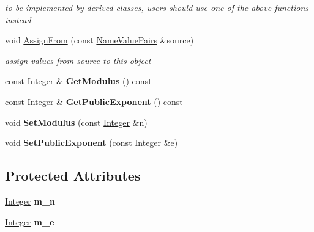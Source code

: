 \begin{DoxyCompactItemize}
\begin{DoxyCompactList}\small\item\em to be implemented by derived classes, users should use one of the above functions instead \item\end{DoxyCompactList}\item 
void \hyperlink{class_l_u_c_function_af6a95ed660e53a5fa07841f139d43ccf}{AssignFrom} (const \hyperlink{class_name_value_pairs}{NameValuePairs} \&source)
\begin{DoxyCompactList}\small\item\em assign values from source to this object \item\end{DoxyCompactList}\item 
\hypertarget{class_l_u_c_function_a0a0c4bd6c0abbed477a51a626b0592a4}{
const \hyperlink{class_integer}{Integer} \& {\bfseries GetModulus} () const }
\label{class_l_u_c_function_a0a0c4bd6c0abbed477a51a626b0592a4}

\item 
\hypertarget{class_l_u_c_function_ab06863c8f440355c37f614781c1af352}{
const \hyperlink{class_integer}{Integer} \& {\bfseries GetPublicExponent} () const }
\label{class_l_u_c_function_ab06863c8f440355c37f614781c1af352}

\item 
\hypertarget{class_l_u_c_function_a835af704304ce8f7fca4c522a5493dfd}{
void {\bfseries SetModulus} (const \hyperlink{class_integer}{Integer} \&n)}
\label{class_l_u_c_function_a835af704304ce8f7fca4c522a5493dfd}

\item 
\hypertarget{class_l_u_c_function_aede72346e848ed00fd5f772e849b1655}{
void {\bfseries SetPublicExponent} (const \hyperlink{class_integer}{Integer} \&e)}
\label{class_l_u_c_function_aede72346e848ed00fd5f772e849b1655}

\end{DoxyCompactItemize}
\subsection*{Protected Attributes}
\begin{DoxyCompactItemize}
\item 
\hypertarget{class_l_u_c_function_a41b10646a07c3aacb8a444f83d39019a}{
\hyperlink{class_integer}{Integer} {\bfseries m\_\-n}}
\label{class_l_u_c_function_a41b10646a07c3aacb8a444f83d39019a}

\item 
\hypertarget{class_l_u_c_function_aaa3b521dfa4f330a1334e1ba6673a178}{
\hyperlink{class_integer}{Integer} {\bfseries m\_\-e}}
\label{class_l_u_c_function_aaa3b521dfa4f330a1334e1ba6673a178}

\end{DoxyCompactItemize}


